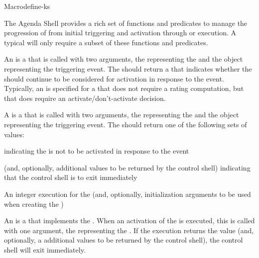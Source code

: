 \documentclass[10pt,twoside,english,pdftex]{article}
\begin{document}
\begin{functiondoc}{Macro}{define-ks}

%
%
%
%
%
%
%
The Agenda Shell provides a rich set of  functions and predicates to
manage the progression of  from initial triggering and activation
through  or execution.  A typical  will only
require a subset of these functions and predicates.

An  is a  that is called with two
arguments, the  representing the  and the
object representing the triggering event.  The 
should return a  that indicates whether the
 should continue to be considered for activation in response to the
event.  Typically, an  is specified for a
 that does not require a  rating
computation, but that does require an activate/don't-activate decision.

A  is a  that is called with two
arguments, the  representing the  and the
object representing the triggering event.  The 
should return one of the following sets of values:
\begin{tightitemize}
\item \nil{} indicating the  is not to be activated in response to
  the event
\item {} (and, optionally, additional values to be returned by the
  control shell) indicating that the control shell is to exit immediately
\item An integer execution  for the  (and,
  optionally, initialization arguments to be used when creating the
   )
\end{tightitemize}

An  is a  that implements the
.  When an activation of the  is executed, this
 is called with one argument, the 
representing the . If the execution  returns the value
 (and, optionally, a additional values to be returned by the
control shell), the control shell will exit immediately.


\end{functiondoc}
\end{document}
